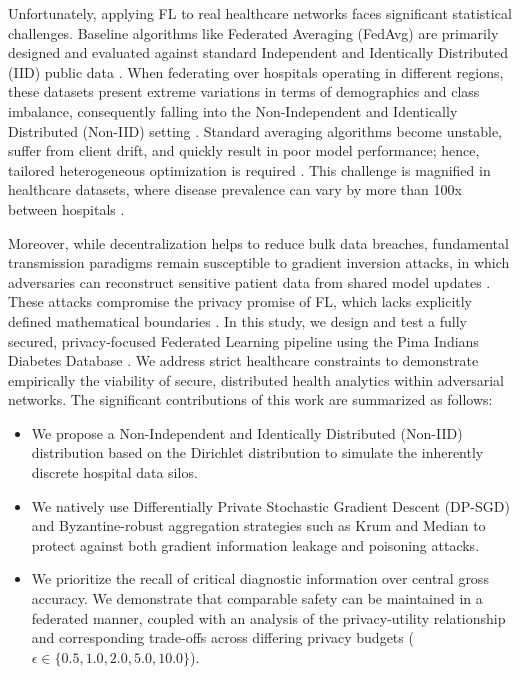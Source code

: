 \documentclass[conference]{IEEEtran}
\begin{document}
Unfortunately, applying FL to real healthcare networks faces significant statistical challenges. Baseline algorithms like Federated Averaging (FedAvg) are primarily designed and evaluated against standard Independent and Identically Distributed (IID) public data \cite{li2020federated_challenges}. When federating over hospitals operating in different regions, these datasets present extreme variations in terms of demographics and class imbalance, consequently falling into the Non-Independent and Identically Distributed (Non-IID) setting \cite{zhao2018federated}. Standard averaging algorithms become unstable, suffer from client drift, and quickly result in poor model performance; hence, tailored heterogeneous optimization is required \cite{fedprox, scaffold}. This challenge is magnified in healthcare datasets, where disease prevalence can vary by more than 100x between hospitals \cite{li2022federated}.

Moreover, while decentralization helps to reduce bulk data breaches, fundamental transmission paradigms remain susceptible to gradient inversion attacks, in which adversaries can reconstruct sensitive patient data from shared model updates \cite{zhu2019deep}. These attacks compromise the privacy promise of FL, which lacks explicitly defined mathematical boundaries \cite{dwork2014algorithmic, abadi2016deep}. In this study, we design and test a fully secured, privacy-focused Federated Learning pipeline using the Pima Indians Diabetes Database \cite{smith1988using}. We address strict healthcare constraints to demonstrate empirically the viability of secure, distributed health analytics within adversarial networks. The significant contributions of this work are summarized as follows:
\begin{itemize}
    \item We propose a Non-Independent and Identically Distributed (Non-IID) distribution based on the Dirichlet distribution to simulate the inherently discrete hospital data silos.
    \item We natively use Differentially Private Stochastic Gradient Descent (DP-SGD) and Byzantine-robust aggregation strategies such as Krum and Median to protect against both gradient information leakage and poisoning attacks.
    \item We prioritize the recall of critical diagnostic information over central gross accuracy. We demonstrate that comparable safety can be maintained in a federated manner, coupled with an analysis of the privacy-utility relationship and corresponding trade-offs across differing privacy budgets (\( \epsilon \in \{0.5, 1.0, 2.0, 5.0, 10.0\} \)).
\end{itemize}
\end{document}

